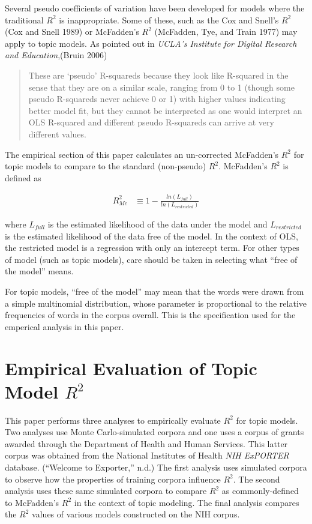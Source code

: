 \documentclass[conference,final,]{IEEEtran}
\begin{document}
Several pseudo coefficients of variation have been developed for models
where the traditional \(R^2\) is inappropriate. Some of these, such as
the Cox and Snell's \(R^2\) (Cox and Snell 1989) or McFadden's \(R^2\)
(McFadden, Tye, and Train 1977) may apply to topic models. As pointed
out in \emph{UCLA's Institute for Digital Research and Education},(Bruin
2006)

\begin{quote}
These are `pseudo' R-squareds because they look like R-squared in the sense that they are on a similar scale, ranging from 0 to 1 (though some pseudo R-squareds never achieve 0 or 1) with higher values indicating better model fit, but they cannot be interpreted as one would interpret an OLS R-squared and different pseudo R-squareds can arrive at very different values. 
\end{quote}

The empirical section of this paper calculates an un-corrected
McFadden's \(R^2\) for topic models to compare to the standard
(non-pseudo) \(R^2\). McFadden's \(R^2\) is defined as

\begin{align}
    R^2_{Mc} & \equiv 1 - \frac{ ln( L_{full} ) }{ ln( L_{restricted} ) }
\end{align}

where \(L_{full}\) is the estimated likelihood of the data under the
model and \(L_{restricted}\) is the estimated likelihood of the data
free of the model. In the context of OLS, the restricted model is a
regression with only an intercept term. For other types of model (such
as topic models), care should be taken in selecting what ``free of the
model'' means.

For topic models, ``free of the model'' may mean that the words were
drawn from a simple multinomial distribution, whose parameter is
proportional to the relative frequencies of words in the corpus overall.
This is the specification used for the emperical analysis in this paper.

\hypertarget{empirical-evaluation-of-topic-model-r2}{%
\section{\texorpdfstring{Empirical Evaluation of Topic Model
\(R^2\)}{Empirical Evaluation of Topic Model R\^{}2}}\label{empirical-evaluation-of-topic-model-r2}}

This paper performs three analyses to empirically evaluate \(R^2\) for
topic models. Two analyses use Monte Carlo-simulated corpora and one
uses a corpus of grants awarded through the Department of Health and
Human Services. This latter corpus was obtained from the National
Institutes of Health \emph{NIH ExPORTER} database. (``Welcome to
Exporter,'' n.d.) The first analysis uses simulated corpora to observe
how the properties of training corpora influence \(R^2\). The second
analysis uses these same simulated corpora to compare \(R^2\) as
commonly-defined to McFadden's \(R^2\) in the context of topic modeling.
The final analysis compares the \(R^2\) values of various models
constructed on the NIH corpus.
\end{document}
